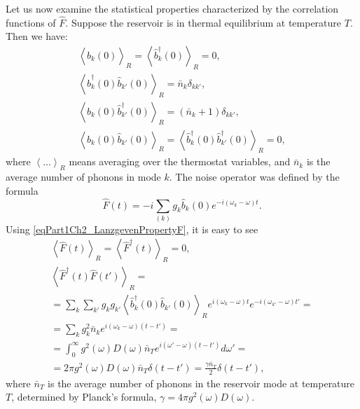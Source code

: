 Let us now examine the statistical properties characterized by the correlation functions of $\hat{F}$. Suppose the reservoir is in thermal equilibrium at temperature $T$. Then we have:
\begin{eqnarray}
\left<\hat{b}_k\left(0\right)\right>_R = 
\left<\hat{b}_k^{\dag}\left(0\right)\right>_R = 0, 
\nonumber \\
\left<\hat{b}_k^{\dag}\left(0\right)\hat{b}_{k'}\left(0\right)\right>_R = 
\bar{n}_k \delta_{k k'},
\nonumber \\
\left<\hat{b}_k\left(0\right)\hat{b}_{k'}^{\dag}\left(0\right)\right>_R = 
\left(\bar{n}_k + 1\right)\delta_{k k'},
\nonumber \\
\left<\hat{b}_k\left(0\right)\hat{b}_{k'}\left(0\right)\right>_R = 
\left<\hat{b}_k^{\dag}\left(0\right)\hat{b}_{k'}^{\dag}\left(0\right)\right>_R
= 0,
\label{eqPart1Ch2_LanzgevenPropertyF}
\end{eqnarray}
where $\left<\dots\right>_R$ means averaging over the thermostat variables, and $\bar{n}_k$ is the average number of phonons in mode $k$. The noise operator was defined by the formula 
\begin{equation}
\hat{F}\left(t\right) = -i \sum_{(k)}g_k 
\hat{b}_k\left(0\right)
e^{-i \left(\omega_k - \omega\right)t}.
\label{eqPart1Ch2_LanzgevenDefenitionF}
\end{equation}
Using \eqref{eqPart1Ch2_LanzgevenPropertyF}, it is easy to see
\begin{eqnarray}
\left<\hat{F}\left(t\right)\right>_R =
\left<\hat{F}^{\dag}\left(t\right)\right>_R  = 0,
\nonumber \\
\left<\hat{F}^{\dag}\left(t\right)\hat{F}\left(t'\right)\right>_R = 
\nonumber \\
= \sum_{k}\sum_{k'}g_k g_{k'}
\left<\hat{b}_k^{\dag}\left(0\right)\hat{b}_{k'}\left(0\right)\right>_R 
e^{i\left(\omega_k - \omega\right)t} 
 e^{-i\left(\omega_{k'} - \omega\right)t'} =
\nonumber \\
= \sum_{k}g_k^2 \bar{n}_k 
e^{i\left(\omega_k - \omega\right)\left(t - t'\right)} = 
\nonumber \\
=
\int_0^\infty
g^2\left(\omega\right)D\left(\omega\right)\bar{n}_T
e^{i\left(\omega' - \omega\right)\left(t - t'\right)}d \omega' = 
\nonumber \\
= 2 \pi
g^2\left(\omega\right)D\left(\omega\right)\bar{n}_T
\delta\left(t - t'\right) =
\frac{\gamma \bar{n}_{T}}{2} \delta\left(t - t'\right),
\label{eqPart1Ch2_LanzgevenCorrelations}
\end{eqnarray}
where $\bar{n}_T$ is the average number of phonons in the reservoir mode at temperature $T$, determined by Planck's formula, $\gamma = 4 \pi g^2\left(\omega\right)D\left(\omega\right)$.
